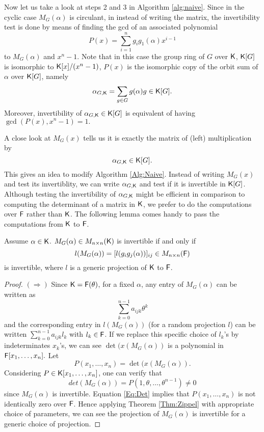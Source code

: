 {Now let us take a look at steps 2 and 3 in Algorithm \ref{alg:naive}. Since in the cyclic case $M_G(\alpha)$ is circulant,
 in \cite{Giesbrecht} instead of writing the matrix, the invertibility test is done by means of finding the gcd of an 
 associated polynomial 
$$P(x) = \sum_{i = 1}^n g_ig_1(\alpha)x^{i-1}$$ 
 to $M_G(\alpha)$ and $x^n-1$. Note that in this case the group ring of $G$ over ${\mathsf{K}}$, ${\mathsf{K}}[G]$ is isomorphic to ${\mathsf{K}}[x]/(x^n-1)$,
 $P(x)$ is the isomorphic copy of the orbit sum of $\alpha$ over ${\mathsf{K}}[G]$, namely
 $$\alpha_{G,{\mathsf{K}}} = \sum_{g \in G} g(\alpha)g \in {\mathsf{K}}[G].$$
 Moreover, invertibility of $\alpha_{G,{\mathsf{K}}}\in {\mathsf{K}}[G]$ is equivalent of having $\gcd (P(x),x^n-1) =1.$
 
 A close look at $M_G(x)$ tells us it is exactly the matrix of (left) multiplication by $$\alpha_{G,{\mathsf{K}}} \in {\mathsf{K}}[G].$$  This gives an idea to modify Algorithm \ref{Alg:Naive}. Instead of writing $M_G(x)$ and test its  invertiblity, 
 we can write $\alpha_{G,{\mathsf{K}}}$ and test if it is invertible in ${\mathsf{K}}[G]$. Although testing the invertibility of $\alpha_{G,{\mathsf{K}}}$ might be efficient in
 comparison to computing the determinant of a matrix in ${\mathsf{K}}$, we prefer to do the computations over ${\mathsf{F}}$ rather than ${\mathsf{K}}$. The  following lemma
 comes handy to pass the computations from ${\mathsf{K}}$ to ${\mathsf{F}}$.


\begin{lemma}\label{Lem:Proj}
Assume $\alpha \in {\mathsf{K}}$. $M_G(\alpha) \in M_{n \times n}({\mathsf{K}})$ 
is invertible if and only if $$l(M_G(\alpha)) =  [l(g_ig_j(\alpha))]_{ij}  \in M_{n \times n}({\mathsf{F}})$$ is invertible,
 where $l$ is a generic projection of ${\mathsf{K}}$ to ${\mathsf{F}}$.
\end{lemma}

\begin{proof}
$(\Rightarrow)$ Since ${\mathsf{K}} = {\mathsf{F}}(\theta)$, for a fixed $\alpha$, any entry of $M_G(\alpha)$ can be written as 
\begin{equation}\label{Eq:PrimElm}
\sum_{k= 0}^{n-1} a_{ijk}\theta^k
\end{equation}
 and the corresponding entry in $l(M_G(\alpha))$ (for a random projection $l$)
 can be written $\sum_{k= 0}^{n-1} a_{ijk}l_k$ with $l_k\in {\mathsf{F}}$. If we replace this specific choice of $l_k$'s by 
 indeterminates $x_k$'s, we can see $\det(x(M_G(\alpha))$ is a polynomial in ${\mathsf{F}}[x_1, \ldots, x_n].$ Let 
 $$P(x_1, \ldots, x_n) = \det(x(M_G(\alpha)).$$ 
 Considering $P \in {\mathsf{K}}[x_1, \ldots , x_n]$, one can verify that 
 \begin{equation}\label{Eq:Det}
 det(M_G(\alpha))= P(1, \theta, \ldots, \theta^{n-1}) \neq 0
 \end{equation}
 since $M_G(\alpha)$ is invertible. Equation \ref{Eq:Det} implies that $P(x_1, \ldots, x_n)$ is not identically zero over ${\mathsf{F}}$. Hence applying Theorem \ref{Thm:Zippel} with appropriate choice of parameters, we can see 
 the projection of $M_G(\alpha)$ is invertible for a generic choice of projection. 
 

\end{proof}}
